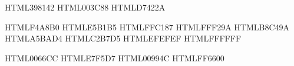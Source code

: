 \fancyheadoffset{0pt}            %
\setlength{\headheight}{14pt}    %


\usepackage{color}
\usepackage{xcolor}


\definecolor{fafugreen}   {HTML}{398142}
\definecolor{xmublue}     {HTML}{003C88}
\definecolor{xmured}      {HTML}{D7422A}

\definecolor{myred}       {HTML}{F4A8B0}
\definecolor{mypink}      {HTML}{E5B1B5}
\definecolor{myorange}    {HTML}{FFC187}
\definecolor{myyellow}    {HTML}{FFF29A}
\definecolor{mygreen}     {HTML}{B8C49A}
\definecolor{myblue}      {HTML}{A5BAD4}
\definecolor{mypurple}    {HTML}{C2B7D5}
\definecolor{mygray}      {HTML}{EFEFEF}
\definecolor{mywhite}     {HTML}{FFFFFF}

\definecolor{linkblue}    {HTML}{0066CC}
\definecolor{linkred}     {HTML}{E7F5D7}
\definecolor{linkgreen}   {HTML}{00994C}
\definecolor{linkorange}  {HTML}{FF6600}


\usepackage[colorlinks=true,hyperfootnotes=true]{hyperref}

\makeatletter
\newcommand\setlabel[1]{\def\@currentlabelname{#1}\label{#1}}
\makeatother

\hypersetup{
    linkcolor=linkblue,    %
    citecolor=linkgreen,   %
    urlcolor=linkblue    %
}


\usepackage[bottom,hang,flushmargin]{footmisc}

\renewcommand{\footnoterule}{%
  \kern 10pt %
  \hrule width 0.4\textwidth height 0.4pt %
}

